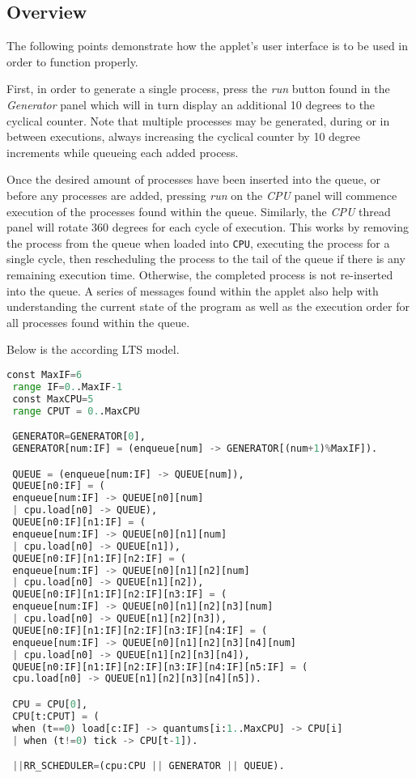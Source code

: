 \documentclass[]{report}
\begin{document}
\subsection*{Overview}
The following points demonstrate how the applet's user interface is to be used in order to function properly. \par 
First, in order to generate a single process, press the \textit{run} button found in the \textit{Generator} panel which will in turn display an additional 10 degrees to the cyclical counter. Note that multiple processes may be generated, during or in between executions, always increasing the cyclical counter by 10 degree increments while queueing each added process. \par 
Once the desired amount of processes have been inserted into the queue, or before any processes are added, pressing \textit{run} on the \textit{CPU} panel will commence execution of the processes found within the queue. Similarly, the \textit{CPU} thread panel will rotate 360 degrees for each cycle of execution. This works by removing the process from the queue when loaded into \verb|CPU|, executing the process for a single cycle, then rescheduling the process to the tail of the queue if there is any remaining execution time. Otherwise, the completed process is not re-inserted into the queue. A series of messages found within the applet also help with understanding the current state of the program as well as the execution order for all processes found within the queue. \par 
Below is the according LTS model. 
\vspace{2mm}
\begin{lstlisting}[language=Python, frame=l]
 const MaxIF=6
 range IF=0..MaxIF-1
 const MaxCPU=5
 range CPUT = 0..MaxCPU 

 GENERATOR=GENERATOR[0],
 GENERATOR[num:IF] = (enqueue[num] -> GENERATOR[(num+1)%MaxIF]).

 QUEUE = (enqueue[num:IF] -> QUEUE[num]),
 QUEUE[n0:IF] = (
 enqueue[num:IF] -> QUEUE[n0][num]
 | cpu.load[n0] -> QUEUE),
 QUEUE[n0:IF][n1:IF] = (
 enqueue[num:IF] -> QUEUE[n0][n1][num]
 | cpu.load[n0] -> QUEUE[n1]),
 QUEUE[n0:IF][n1:IF][n2:IF] = (
 enqueue[num:IF] -> QUEUE[n0][n1][n2][num]
 | cpu.load[n0] -> QUEUE[n1][n2]),
 QUEUE[n0:IF][n1:IF][n2:IF][n3:IF] = (
 enqueue[num:IF] -> QUEUE[n0][n1][n2][n3][num]
 | cpu.load[n0] -> QUEUE[n1][n2][n3]),
 QUEUE[n0:IF][n1:IF][n2:IF][n3:IF][n4:IF] = (
 enqueue[num:IF] -> QUEUE[n0][n1][n2][n3][n4][num]
 | cpu.load[n0] -> QUEUE[n1][n2][n3][n4]),
 QUEUE[n0:IF][n1:IF][n2:IF][n3:IF][n4:IF][n5:IF] = (
 cpu.load[n0] -> QUEUE[n1][n2][n3][n4][n5]).

 CPU = CPU[0],
 CPU[t:CPUT] = (
 when (t==0) load[c:IF] -> quantums[i:1..MaxCPU] -> CPU[i]
 | when (t!=0) tick -> CPU[t-1]).

 ||RR_SCHEDULER=(cpu:CPU || GENERATOR || QUEUE).
\end{lstlisting}
\end{document}
